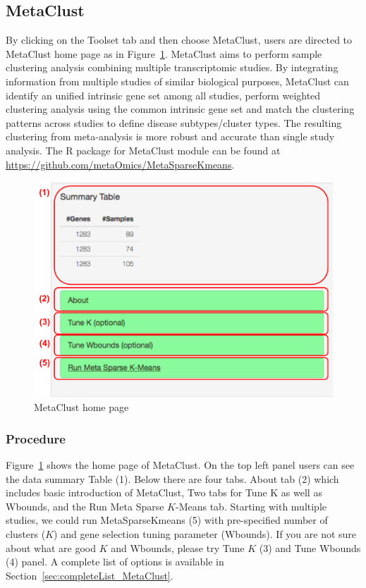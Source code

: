\subsection{MetaClust}
By clicking on the Toolset tab and then choose MetaClust,
users are directed to MetaClust home page as in Figure~\ref{fig:metaClustHome}.
MetaClust \citep{huo2016meta} aims to perform sample clustering analysis combining multiple transcriptomic studies.
By integrating information from multiple studies of similar biological purposes,
MetaClust can identify an unified intrinsic gene set among all studies, perform weighted clustering analysis using the common intrinsic gene set and
match the clustering patterns across studies to define disease subtypes/cluster types.
The resulting clustering from meta-analysis is more robust and accurate than single study analysis.
The R package for MetaClust module can be found at \url{https://github.com/metaOmics/MetaSparseKmeans}.


\begin{figure}[H]
\begin{center}
\includegraphics[scale=0.4]{./figure/metaClust/metaClustHome.pdf}
\caption{MetaClust home page}
\label{fig:metaClustHome}
\end{center}
\end{figure}

\subsubsection{Procedure}


Figure~\ref{fig:metaClustHome} shows the home page of MetaClust.
On the top left panel users can see the data summary Table {\color{red} (1)}.
Below there are four tabs. 
About tab {\color{red} (2)} which includes basic introduction of MetaClust, Two tabs for Tune K as well as Wbounds, and the Run Meta Sparse $K$-Means tab.
Starting with multiple studies, 
we could run MetaSparseKmeans {\color{red} (5)} with pre-specified number of clusters ($K$) and gene selection tuning parameter (Wbounds).
If you are not sure about what are good $K$ and Wbounds, please try Tune $K$ {\color{red} (3)} and Tune Wbounds {\color{red} (4)} panel.
A complete list of options is available in Section~\ref{sec:completeList_MetaClust}.

